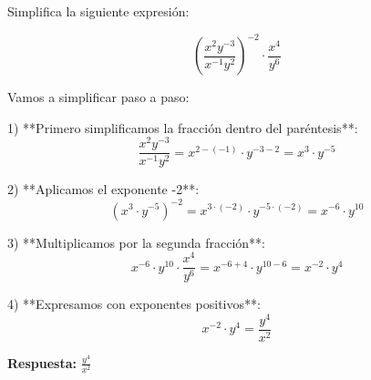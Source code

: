 \begin{ejercicio}[
  id=MATU_ALG_003,
  materia_principal=matematicas_preuniversitaria,
  codigo_materia=MATU,
  capitulo=algebra,
  subtema=exponentes,
  nivel=intermedio,
  procedencia="Libro Álgebra Avanzada",
  visibilidad=web_impreso,
  tiempo_estimado=5,
  libros={algebra_pre, algebra_avanzada},
  dificultad=2,
  tags={exponentes},
  youtube_url="",
  mostrar_solucion=true,
  libro_promocion=""
]
Simplifica la siguiente expresión:

$$\left(\frac{x^2 y^{-3}}{x^{-1} y^2}\right)^{-2} \cdot \frac{x^4}{y^6}$$

\begin{solucion}
Vamos a simplificar paso a paso:

1) **Primero simplificamos la fracción dentro del paréntesis**:
   $$\frac{x^2 y^{-3}}{x^{-1} y^2} = x^{2-(-1)} \cdot y^{-3-2} = x^3 \cdot y^{-5}$$

2) **Aplicamos el exponente -2**:
   $$\left(x^3 \cdot y^{-5}\right)^{-2} = x^{3 \cdot (-2)} \cdot y^{-5 \cdot (-2)} = x^{-6} \cdot y^{10}$$

3) **Multiplicamos por la segunda fracción**:
   $$x^{-6} \cdot y^{10} \cdot \frac{x^4}{y^6} = x^{-6+4} \cdot y^{10-6} = x^{-2} \cdot y^4$$

4) **Expresamos con exponentes positivos**:
   $$x^{-2} \cdot y^4 = \frac{y^4}{x^2}$$

\textbf{Respuesta:} $\frac{y^4}{x^2}$
\end{solucion}
\end{ejercicio}